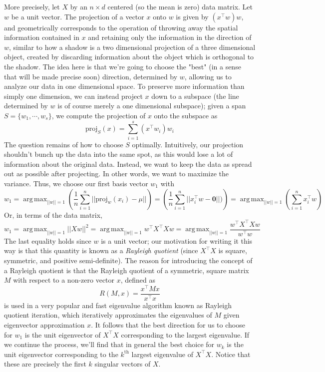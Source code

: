 \documentclass{article}
\DeclareMathOperator*{\argmax}{arg\,max}
\begin{document}
More precisely, let $ X $ by an $ n \times d $ centered (so the mean is zero) data matrix. Let $ w $ be a unit vector. The projection of a vector $ x $ onto $ w $ is given by $ (x^\intercal w) w $, and geometrically corresponds to the operation of throwing away the spatial information contained in $ x $ and retaining only the information in the direction of $ w $, similar to how a shadow is a two dimensional projection of a three dimensional object, created by discarding information about the object which is orthogonal to the shadow. The idea here is that we're going to choose the "best" (in a sense that will be made precise soon) direction, determined by $ w $, allowing us to analyze our data in one dimensional space. To preserve more information than simply one dimension, we can instead project $ x $ down to a subspace (the line determined by $ w $ is of course merely a one dimensional subspace); given a span $ S = \{ w_1, \cdots, w_s \} $, we compute the projection of $ x $ onto the subspace as
$$ \text{proj}_S(x) = \sum_{i = 1}^s (x^\intercal w_i) w_i $$
The question remains of how to choose $ S $ optimally. Intuitively, our projection shouldn't bunch up the data into the same spot, as this would lose a lot of information about the original data. Instead, we want to keep the data as spread out as possible after projecting. In other words, we want to maximize the variance. Thus, we choose our first basis vector $ w_1 $ with
$$ w_1 = \argmax_{|| w || = 1} \left( \frac{1}{n} \sum_{i = 1}^n || \text{proj}_w(x_i) - \mu || \right) = \left( \frac{1}{n} \sum_{i = 1}^n || x_i^\intercal w - \textbf{0} ||) \right) = \argmax_{|| w || = 1} \left( \sum_{i = 1}^n x_i^\intercal w \right) $$
Or, in terms of the data matrix,
$$ w_1 = \argmax_{|| w || = 1} || X w ||^2 = \argmax_{|| w || = 1} w^\intercal X^\intercal X w = \argmax_{|| w || = 1} \frac{w^\intercal X^\intercal X w}{w^\intercal w} $$
The last equality holds since $ w $ is a unit vector; our motivation for writing it this way is that this quantity is known as a \textit{Rayleigh quotient} (since $ X^\intercal X $ is square, symmetric, and positive semi-definite). The reason for introducing the concept of a Rayleigh quotient is that the Rayleigh quotient of a symmetric, square matrix $ M $ with respect to a non-zero vector $ x $, defined as
$$ R(M, x) = \frac{x^\intercal M x}{x^\intercal x} $$
is used in a very popular and fast eigenvalue algorithm known as Rayleigh quotient iteration, which iteratively approximates the eigenvalues of $ M $ given eigenvector approximation $ x $. It follows that the best direction for us to choose for $ w_1 $ is the unit eigenvector of $ X^\intercal X $ corresponding to the largest eigenvalue. If we continue the process, we'll find that in general the best choice for $ w_k $ is the unit eigenvector corresponding to the $ k^{\text{th}} $ largest eigenvalue of $ X^\intercal X $. Notice that these are precisely the first $ k $ singular vectors of $ X $.
\end{document}
